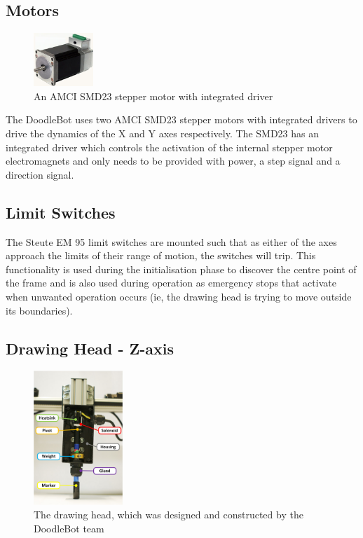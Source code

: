 \subsection{Motors}
	\begin{figure}[h]
		\centering
		\includegraphics[width=0.2\textwidth]{figures/cncMachine/amci-smd23.jpg}
		\caption{An AMCI SMD23 stepper motor with integrated driver}
	\end{figure}
	
	The DoodleBot uses two AMCI SMD23 stepper motors with integrated drivers to drive the dynamics of the X and Y axes respectively. The SMD23 has an integrated driver which controls the activation of the internal stepper motor electromagnets and only needs to be provided with power, a step signal and a direction signal.
\subsection{Limit Switches}
	The Steute EM 95 limit switches are mounted such that as either of the axes approach the limits of their range of motion, the switches will trip. This functionality is used during the initialisation phase to discover the centre point of the frame and is also used during operation as emergency stops that activate when unwanted operation occurs (ie, the drawing head is trying to move outside its boundaries).
\subsection{Drawing Head - Z-axis}
	\begin{figure}[h]
		\centering
		\includegraphics[width=0.3\textwidth]{figures/cncMachine/Z_axis.jpg}
		\caption[The drawing head - Z-axis]{The drawing head, which was designed and constructed by the DoodleBot team}
		\label{fig:z-axis}
	\end{figure}

